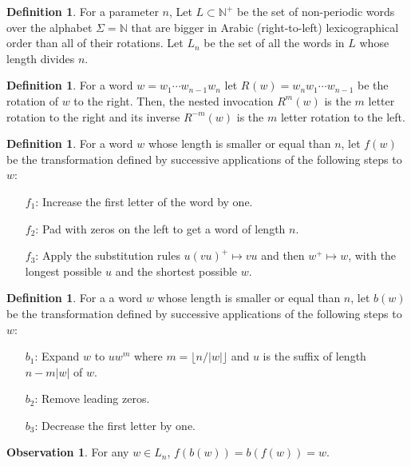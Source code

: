 \documentclass{article}
\theoremstyle{definition}
\newtheorem{definition}[theorem]{Definition}
\newtheorem{observation}[theorem]{Observation}
\newcommand{\N}{{\mathbb{N}}}
\newcommand{\rr}[2]{R^{#2}({#1})}
\newcommand{\rl}[2]{R^{-{#2}}({#1})}
\begin{document}
\begin{definition}
	For a parameter $n$, Let $L \subset \N^+$ be the set of non-periodic words over the alphabet $\Sigma=\N$ that are bigger in Arabic (right-to-left) lexicographical order than all of their rotations. Let $L_n$ be the set of all the words in $L$ whose length divides $n$.
\end{definition}


\begin{definition}
	For a word $w=w_1\cdots w_{n-1}w_n$ let  $\rr{w}{}= w_{n}w_1\cdots w_{n-1}$ be the rotation of $w$ to the right. Then, the nested invocation $\rr{w}{m}$ is the $m$ letter rotation to the right and its inverse $\rl{w}{m}$ is the $m$ letter rotation to the left.
\end{definition}


\begin{definition}\label{forward}
For a word $w$ whose length is smaller or equal than $n$, let  $f(w)$ be the transformation defined by successive applications of the following steps to $w$:
\begin{enumerate}
	\item[$f_1$:] Increase the first letter of the word by one. 
	\item[$f_2$:] Pad with zeros on the left to get a word of length $n$.
	\item[$f_3$:] Apply the substitution rules $u(vu)^+ \mapsto vu$ and then $w^+ \mapsto w$, with the longest possible $u$ and the shortest possible $w$.
\end{enumerate}
\end{definition}

\begin{definition}\label{backward}
For a a word $w$ whose length is smaller or equal than $n$, let  $b(w)$ be the transformation defined by successive applications of the following steps to $w$:
\begin{enumerate}
	\item[$b_1$:] Expand $w$ to $u w^m$ where $m=\lfloor n/ |w| \rfloor$ and $u$ is the suffix of length $n-m|w|$ of $w$.
	
	\item[$b_2$:] Remove leading zeros.
	\item[$b_3$:] Decrease the first letter by one.
\end{enumerate}
\end{definition}

\begin{observation}
	For any $w\in L_n$, $f(b(w))=b(f(w))=w$.
\end{observation}
\end{document}
